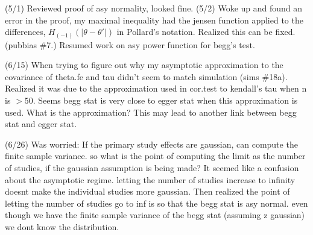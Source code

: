 \documentclass{article}
\begin{document}
(5/1) Reviewed proof of asy normality, looked fine. (5/2) Woke up and
found an error in the proof, my maximal inequality had the jensen
function applied to the differences, $H_{(-1)}(|\theta-\theta'|)$ in
Pollard's notation. Realized this can be fixed. (pubbias \#7.) Resumed
work on asy power function for begg's test.

(6/15) When trying to figure out why my asymptotic approximation to
the covariance of theta.fe and tau didn't seem to match simulation
(sims \#18a). Realized it was due to the approximation used in
cor.test to kendall's tau when n is $>50$. Seems begg stat is very
close to egger stat when this approximation is used. What is the
approximation? This may lead to another link between begg stat and
egger stat.


(6/26) Was worried: If the primary study effects are gaussian, can
compute the finite sample variance. so what is the point of computing
the limit as the number of studies, if the gaussian assumption is
being made? It seemed like a confusion about the asymptotic
regime. letting the number of studies increase to infinity doesnt make
the individual studies more gaussian. Then realized the point of
letting the number of studies go to inf is so that the begg stat is
asy normal. even though we have the finite sample variance of the begg
stat (assuming z gaussian) we dont know the distribution.
\end{document}

